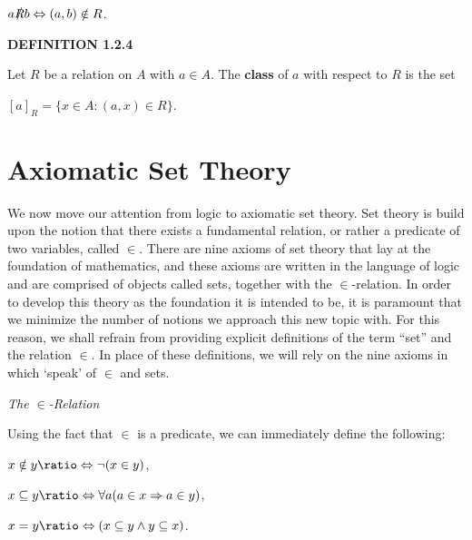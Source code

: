 \documentclass[12pt, a4paper]{article}
\newcommand*{\logeq}{\ratio\Leftrightarrow}
\begin{document}
\vspace{4mm}

\centerline{$a\slashed{R} b\Leftrightarrow(a,b)\notin R$.}

\vspace{6mm}

\noindent\blacksquare\textbf{ DEFINITION 1.2.4}\par

\vspace{4mm}

Let $R$ be a relation on $A$ with $a\in A$. The \textbf{class} of $a$ with respect to $R$ is the set

\vspace{4mm}

\centerline{$[a]_R=\{x\in A\colon(a,x)\in R\}$.}


\newpage

\section{Axiomatic Set Theory}

We now move our attention from logic to axiomatic set theory. Set theory is build upon the notion that there exists a fundamental relation, or rather a predicate of two variables, called $\in$. There are nine axioms of set theory that lay at the foundation of mathematics, and these axioms are written in the language of logic and are comprised of objects called sets, together with the $\in$-relation. In order to develop this theory as the foundation it is intended to be, it is paramount that we minimize the number of notions we approach this new topic with. For this reason, we shall refrain from providing explicit definitions of  the term ``set'' and the relation $\in$. In place of these definitions, we will rely on the nine axioms in which `speak' of $\in$ and sets.\par


\vspace{8mm}
 
\noindent\large{\textit{The $\in$-Relation}}\normalsize

\vspace{4mm}

\noindent Using the fact that $\in$ is a predicate, we can immediately define the following:\par

\begin{description}

    \item $x\notin y\logeq\neg(x\in y)$,
    \item $x\subseteq y\logeq\forall a(a\in x\Rightarrow a\in y)$,
    \item $x=y\logeq(x\subseteq y\wedge y\subseteq x)$.

\end{description}
\end{document}
